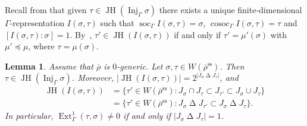 \documentclass[JEP,XML,SOM,Unicode,NoFloatCountersInSection, NoEqCountersInSection,published]{cedram}
\renewcommand{\ss}{\mathrm{ss}}
\newcommand{\rhobar}{\overline{\rho}}
\newcommand{\brho}{\overline{\rho}}
\DeclareMathOperator{\cosoc}{cosoc}
\DeclareMathOperator{\Ext}{Ext}
\DeclareMathOperator{\Inj}{Inj}
\DeclareMathOperator{\JH}{\mathrm{JH}}
\DeclareMathOperator{\soc}{soc}
\theoremstyle{plain}
\newtheorem{lem}[prop]{Lemma}
\theoremstyle{definition}
\begin{document}
Recall from \cite[Cor.\,3.12]{BP} that given $\tau\in \JH(\Inj_{\Gamma}\sigma)$ there exists a unique finite-dimensional $\Gamma$-representation $I(\sigma,\tau)$ such that $\soc_{\Gamma}I(\sigma,\tau)=\sigma$, $\cosoc_{\Gamma}I(\sigma,\tau)=\tau$ and $[I(\sigma,\tau):\sigma]=1$. By~\cite[Cor.\,4.11]{BP}, $\tau'\in \JH(I(\sigma,\tau))$ if and only if $\tau' = \mu'(\sigma)$ with $\mu'\preceq \mu$, where $\tau = \mu(\sigma)$.

\begin{lem}\label{lem:I-sigma-tau-modular}
Assume that $\rhobar$ is $0$-generic.
Let $\sigma,\tau\in W(\brho^{\ss})$. Then $\tau\in\JH(\Inj_{\Gamma}\sigma)$. Moreover, $|\JH(I(\sigma,\tau))|=2^{|J_{\sigma}\mathbin\Delta J_{\tau}|}$, and
\begin{align}
\JH(I(\sigma,\tau))&=\{\tau'\in W(\brho^{\ss}): J_{\sigma}\cap J_{\tau}\subset J_{\tau'}\subset J_{\sigma}\cup J_{\tau}\} \label{eq:JH-I-sigma-tau}\\
&= \{\tau'\in W(\brho^{\ss}): J_{\sigma}\mathbin\Delta J_{\tau'}\subset J_{\sigma}\mathbin\Delta J_{\tau}\}.\label{eq:JH-I-sigma-tau2}
\end{align}
In particular, $\Ext^1_\Gamma(\tau,\sigma) \ne 0$ if and only if $|J_{\sigma}\mathbin\Delta J_{\tau}| = 1$.
\end{lem}
\end{document}
